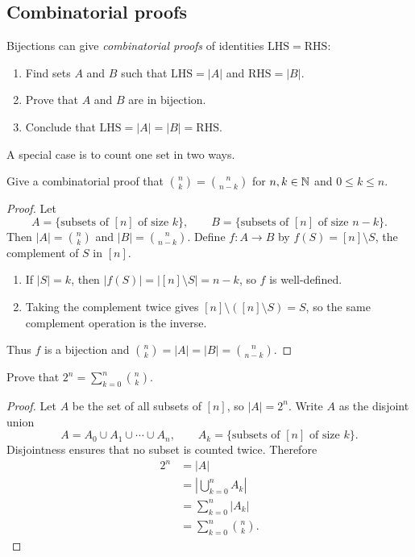 \subsection{Combinatorial proofs}
Bijections can give \textit{combinatorial proofs} of identities $\mathrm{LHS}=\mathrm{RHS}$:
\begin{enumerate}
\item Find sets $A$ and $B$ such that $\mathrm{LHS}=|A|$ and $\mathrm{RHS}=|B|$.
\item Prove that $A$ and $B$ are in bijection.
\item Conclude that $\mathrm{LHS}=|A|=|B|=\mathrm{RHS}$.
\end{enumerate}
A special case is to count one set in two ways.
\begin{example}
Give a combinatorial proof that $\displaystyle\binom{n}{k}=\binom{n}{n-k}$ for $n,k\in\mathbb{N}$ and $0\le k\le n$.
\end{example}
\begin{proof}
Let
\[
A=\{\text{subsets of $[n]$ of size $k$}\},\qquad
B=\{\text{subsets of $[n]$ of size $n-k$}\}.
\]
Then $|A|=\binom{n}{k}$ and $|B|=\binom{n}{n-k}$. Define $f\colon A\to B$ by $f(S)=[n]\setminus S$, the complement of $S$ in $[n]$.
\begin{enumerate}
\item If $|S|=k$, then $|f(S)|=|[n]\setminus S|=n-k$, so $f$ is well-defined.
\item Taking the complement twice gives $[n]\setminus([n]\setminus S)=S$, so the same complement operation is the inverse.
\end{enumerate}
Thus $f$ is a bijection and $\binom{n}{k}=|A|=|B|=\binom{n}{n-k}$.
\end{proof}
\begin{example}
Prove that $\displaystyle 2^n=\sum_{k=0}^n\binom{n}{k}$.
\end{example}
\begin{proof}
Let $A$ be the set of all subsets of $[n]$, so $|A|=2^n$. Write $A$ as the disjoint union
\[
A=A_0\cup A_1\cup\cdots\cup A_n,
\qquad A_k=\{\text{subsets of $[n]$ of size $k$}\}.
\]
Disjointness ensures that no subset is counted twice. Therefore
\[
\begin{aligned}
2^n&=|A|\\
&=\left|\bigcup_{k=0}^n A_k\right|\\
&=\sum_{k=0}^n|A_k|\\
&=\sum_{k=0}^n\binom{n}{k}.
\end{aligned}
\]
\end{proof}
